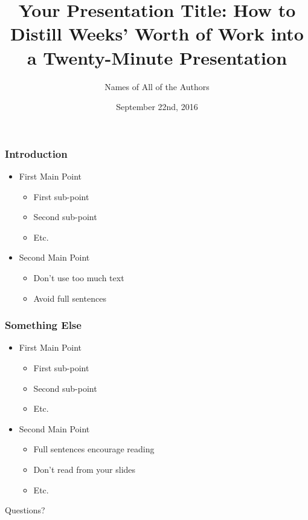 \documentclass{beamer}
\title[Your Short Title]{Your Presentation Title: How to Distill Weeks' Worth of Work into a Twenty-Minute Presentation}
\date{September 22nd, 2016}
\author[Short Name]{Names of All of the Authors}
\institute[UCSB]{ECON 241A}
\begin{document}
\begin{frame}
\titlepage
\end{frame}

\linespread{1.5} %

\begin{frame}
\frametitle{Introduction}
	\begin{itemize}
	\item First Main Point
		\begin{itemize}
		\item First sub-point
		\item Second sub-point
		\item Etc.
		\end{itemize}
	\item Second Main Point
		\begin{itemize}
		\item Don't use too much text
		\item Avoid full sentences
		\end{itemize}
	\end{itemize}
\end{frame}

\begin{frame}
\frametitle{Something Else}
	\begin{itemize}
	\item First Main Point
		\begin{itemize}
		\item First sub-point
		\item Second sub-point
		\item Etc.
		\end{itemize}
	\item Second Main Point
		\begin{itemize}
		\item Full sentences encourage reading
		\item Don't read from your slides
		\item Etc.
		\end{itemize}
	\end{itemize}
\end{frame}

\begin{frame}
\vspace*{\fill}
\centering\Huge Questions?
\vspace*{\fill}
\end{frame}
\end{document}
